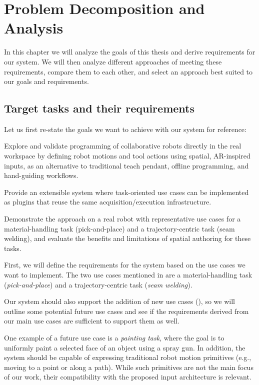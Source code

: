 \chapter{Problem Decomposition and Analysis} \label{chapter:ch2_analysis}

In this chapter we will analyze the goals of this thesis and derive requirements for our system. We will then analyze different approaches of meeting these requirements, compare them to each other, and select an approach best suited to our goals and requirements. 

\section{Target tasks and their requirements} \label{sec:ch2_analysis_tasks_and_requirements}

Let us first re-state the goals we want to achieve with our system for reference:
\begin{goals}
  \item \label{an_goal:1} Explore and validate programming of collaborative robots directly in the real workspace by defining robot motions and tool actions using spatial, AR-inspired inputs, as an alternative to traditional teach pendant, offline programming, and hand-guiding workflows.
  \item \label{an_goal:2} Provide an extensible system where task-oriented use cases can be implemented as plugins that reuse the same acquisition/execution infrastructure.
  \item \label{an_goal:3} Demonstrate the approach on a real robot with representative use cases for a material-handling task (pick-and-place) and a trajectory-centric task (seam welding), and evaluate the benefits and limitations of spatial authoring for these tasks.
\end{goals}

First, we will define the requirements for the system based on the use cases we want to implement. The two use cases mentioned in  are a material-handling task (\emph{pick-and-place}) and a trajectory-centric task (\emph{seam welding}). 

Our system should also support the addition of new use cases (), so we will outline some potential future use cases and see if the requirements derived from our main use cases are sufficient to support them as well. 

One example of a future use case is a \emph{painting task}, where the goal is to uniformly paint a selected face of an object using a spray gun. In addition, the system should be capable of expressing traditional robot motion primitives (e.g., moving to a point or along a path). While such primitives are not the main focus of our work, their compatibility with the proposed input architecture is relevant.

